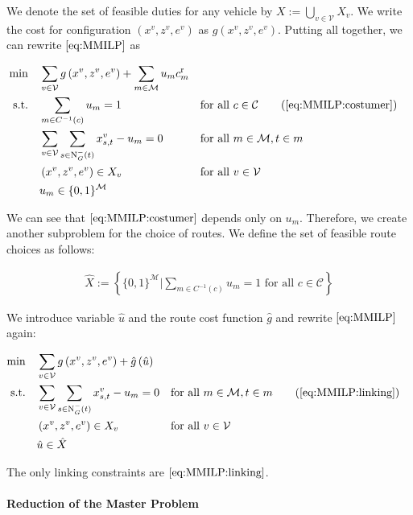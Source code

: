 We denote the set of feasible duties for any vehicle by $X:=\bigcup_{v\in\mathcal{V}}X_v$. We write the cost for configuration $\left(x^v,z^v,e^v\right)$ as $g\left(x^v,z^v,e^v\right)$. Putting all together, we can rewrite $\eqref{eq:MMILP}$ as

\begin{align}
	\min \quad & \sum_{v\in\mathcal{V}}g\left(x^v,z^v,e^v\right) + \sum_{m\in\mathcal{M}} u_m \croute_m \nonumber \\
	\text{s.t.} \quad & \sum_{m\in C^{-1}(c)} u_m = 1 && \text{for all } c\in\mathcal{C} \tag{\ref{eq:MMILP:costumer}} \\
	& \sum_{v\in\mathcal{V}}\sum_{s\in\Nin(t)}x^v_{s,t} - u_m = 0 && \text{for all } m\in\mathcal{M},t\in m \label{eq:MMILP:linking}\\
	& \left(x^v,z^v,e^v\right)\in X_v && \text{for all } v\in\mathcal{V} \nonumber \\
	& u_m\in\{0,1\}^{\mathcal{M}} \nonumber
\end{align}

We can see that $\eqref{eq:MMILP:costumer}$ depends only on $u_m$. Therefore, we create another subproblem for the choice of routes. We define the set of feasible route choices as follows:

\begin{align*}
	\hat{X} := \left\{\{0,1\}^{\mathcal{M}}|\sum_{m\in C^{-1}(c)} u_m = 1 \text{ for all } c\in\mathcal{C}\right\}
\end{align*}

We introduce variable $\hat{u}$ and the route cost function $\hat{g}$ and rewrite $\eqref{eq:MMILP}$ again:

\begin{align}
	\min \quad & \sum_{v\in\mathcal{V}}g\left(x^v,z^v,e^v\right) + \hat{g}\left(\hat{u}\right) \nonumber \\
	\text{s.t.} \quad & \sum_{v\in\mathcal{V}}\sum_{s\in\Nin(t)}x^v_{s,t} - u_m = 0 && \text{for all } m\in\mathcal{M},t\in m \tag{\ref{eq:MMILP:linking}}\\
	& \left(x^v,z^v,e^v\right)\in X_v && \text{for all } v\in\mathcal{V} \nonumber \\
	& \hat{u}\in\hat{X} \nonumber
\end{align}

The only linking constraints are $\eqref{eq:MMILP:linking}$.

\paragraph{Reduction of the Master Problem} \parfill

